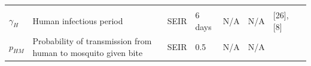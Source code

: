 \documentclass[10pt,letterpaper]{article}
\begin{document}
\begin{longtable}[]{@{}llllllll@{}}
\begin{minipage}[t]{0.26\columnwidth}
\strut
\end{minipage}\tabularnewline
\begin{minipage}[t]{0.04\columnwidth}\raggedright\strut
\(\gamma_H\)\strut
\end{minipage} & \begin{minipage}[t]{0.17\columnwidth}\raggedright\strut
Human infectious period\strut
\end{minipage} & \begin{minipage}[t]{0.05\columnwidth}\raggedright\strut
SEIR\strut
\end{minipage} & \begin{minipage}[t]{0.05\columnwidth}\raggedright\strut
6 days\strut
\end{minipage} & \begin{minipage}[t]{0.04\columnwidth}\raggedright\strut
N/A\strut
\end{minipage} & \begin{minipage}[t]{0.04\columnwidth}\raggedright\strut
N/A\strut
\end{minipage} & \begin{minipage}[t]{0.14\columnwidth}\raggedright\strut
{[}26{]}, {[}8{]}\strut
\end{minipage} & \begin{minipage}[t]{0.26\columnwidth}\raggedright\strut
\strut
\end{minipage}\tabularnewline
\begin{minipage}[t]{0.04\columnwidth}\raggedright\strut
\(p_{HM}\)\strut
\end{minipage} & \begin{minipage}[t]{0.17\columnwidth}\raggedright\strut
Probability of transmission from human to mosquito given bite\strut
\end{minipage} & \begin{minipage}[t]{0.05\columnwidth}\raggedright\strut
SEIR\strut
\end{minipage} & \begin{minipage}[t]{0.05\columnwidth}\raggedright\strut
0.5\strut
\end{minipage} & \begin{minipage}[t]{0.04\columnwidth}\raggedright\strut
N/A\strut
\end{minipage} & \begin{minipage}[t]{0.04\columnwidth}\raggedright\strut
N/A\strut
\end{minipage} & \begin{minipage}[t]{0.14\columnwidth}\raggedright\strut
\strut
\end{minipage} & \begin{minipage}[t]{0.26\columnwidth}\raggedright\strut

\end{minipage}
\end{longtable}
\end{document}
